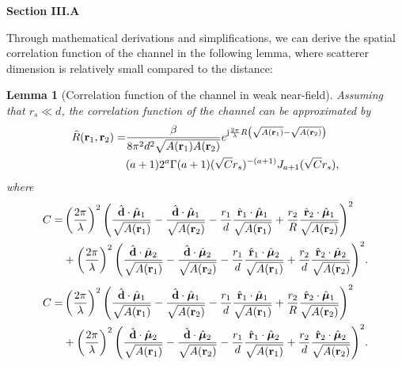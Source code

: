 \documentclass[a4paper,12pt]{article}
\newtheorem{lemma}{\bf Lemma}
\def\onecol{}
\begin{document}
\begin{framed}
{\bf Section III.A}

\setcounter{equation}{14}

\quad Through mathematical derivations and simplifications, we can derive the spatial correlation function of the channel in the following lemma, {\color{red}where scatterer dimension is relatively small compared to the distance}:
\begin{lemma}[{\color{red}Correlation function of the channel in weak near-field}]
	Assuming that $r_s \ll d$, the correlation function of the channel can be approximated by 
	\begin{equation}
		\begin{aligned}
			\tilde{R}({\bf r}_1,{\bf r}_2) =& \frac{\beta}{8\pi^2d^2\sqrt{A({\bf r}_1)A({\bf r}_2)}}e^{{\rm j}\frac{2\pi}{\lambda}R \left(\sqrt{A({\bf r}_1)}-\sqrt{A({\bf r}_2)}\right)} \\&(a+1) 2^{a} \Gamma (a+1) (\sqrt{C}r_s)^{-(a+1)} J_{a+1} (\sqrt{C}r_s),
		\end{aligned}
	\end{equation}
	where
	\ifx\onecol\undefined
   \begin{equation}
	   \begin{aligned}
		   C =& \left( \frac{2\pi}{\lambda}  \right)^2 \Bigg( \frac{\hat{\bf d}\cdot \hat{\boldsymbol{\mu}}_1}{\sqrt{A({\bf r}_1)}} - \frac{\hat{\bf d}\cdot \hat{\boldsymbol{\mu}}_1}{\sqrt{A({\bf r}_2)}} - \frac{r_1}{d} \frac{\hat{\bf r}_1 \cdot \hat{\boldsymbol{\mu}}_1}{\sqrt{A({\bf r}_1)}} + \frac{r_2}{R} \frac{\hat{\bf r}_2 \cdot \hat{\boldsymbol{\mu}}_1}{\sqrt{A({\bf r}_2)}}\Bigg)^2 \\&+  \left( \frac{2\pi}{\lambda}  \right)^2 \Bigg( \frac{\hat{\bf d}\cdot \hat{\boldsymbol{\mu}}_2}{\sqrt{A({\bf r}_1)}} - \frac{\hat{\bf d}\cdot \hat{\boldsymbol{\mu}}_2}{\sqrt{A({\bf r}_2)}} - \frac{r_1}{d} \frac{\hat{\bf r}_1 \cdot \hat{\boldsymbol{\mu}}_2}{\sqrt{A({\bf r}_1)}} + \frac{r_2}{d} \frac{\hat{\bf r}_2 \cdot \hat{\boldsymbol{\mu}}_2}{\sqrt{A({\bf r}_2)}}\Bigg)^2.
	   \end{aligned}
   \end{equation}
   \else
   \begin{equation}
	   \begin{aligned}
		C =& \left( \frac{2\pi}{\lambda}  \right)^2 \Bigg( \frac{\hat{\bf d}\cdot \hat{\boldsymbol{\mu}}_1}{\sqrt{A({\bf r}_1)}} - \frac{\hat{\bf d}\cdot \hat{\boldsymbol{\mu}}_1}{\sqrt{A({\bf r}_2)}} - \frac{r_1}{d} \frac{\hat{\bf r}_1 \cdot \hat{\boldsymbol{\mu}}_1}{\sqrt{A({\bf r}_1)}} + \frac{r_2}{R} \frac{\hat{\bf r}_2 \cdot \hat{\boldsymbol{\mu}}_1}{\sqrt{A({\bf r}_2)}}\Bigg)^2 \\&+  \left( \frac{2\pi}{\lambda}  \right)^2 \Bigg( \frac{\hat{\bf d}\cdot \hat{\boldsymbol{\mu}}_2}{\sqrt{A({\bf r}_1)}} - \frac{\hat{\bf d}\cdot \hat{\boldsymbol{\mu}}_2}{\sqrt{A({\bf r}_2)}} - \frac{r_1}{d} \frac{\hat{\bf r}_1 \cdot \hat{\boldsymbol{\mu}}_2}{\sqrt{A({\bf r}_1)}} + \frac{r_2}{d} \frac{\hat{\bf r}_2 \cdot \hat{\boldsymbol{\mu}}_2}{\sqrt{A({\bf r}_2)}}\Bigg)^2.

\end{aligned}
\end{equation}
\end{lemma}
\end{framed}
\end{document}
